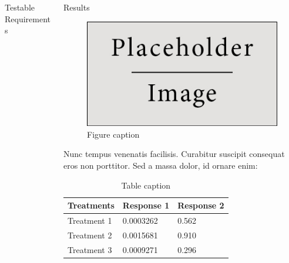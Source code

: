 \documentclass[final]{beamer}
\newlength{\onecolwid}
\newlength{\twocolwid}
\begin{document}
\begin{frame}[t]
\begin{columns}[t]
\begin{column}{\twocolwid}
\begin{columns}[t,totalwidth=\twocolwid]
\begin{column}{\onecolwid}
\begin{block}{Testable Requirements}
\end{block}


\end{column} %

\begin{column}{\onecolwid} %


\begin{block}{Results}

\begin{figure}
\includegraphics[width=0.8\linewidth]{placeholder.jpg}
\caption{Figure caption}
\end{figure}

Nunc tempus venenatis facilisis. Curabitur suscipit consequat eros non porttitor. Sed a massa dolor, id ornare enim:

\begin{table}
\vspace{2ex}
\begin{tabular}{l l l}
\toprule
\textbf{Treatments} & \textbf{Response 1} & \textbf{Response 2}\\
\midrule
Treatment 1 & 0.0003262 & 0.562 \\
Treatment 2 & 0.0015681 & 0.910 \\
Treatment 3 & 0.0009271 & 0.296 \\
\bottomrule
\end{tabular}
\caption{Table caption}
\end{table}

\end{block}



\end{column}
\end{columns}
\end{column}
\end{columns}
\end{frame}
\end{document}
